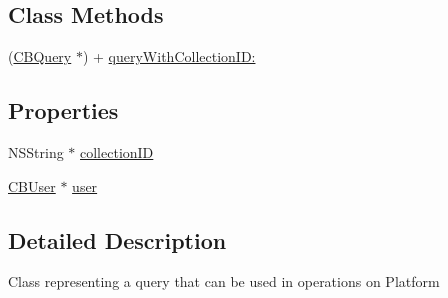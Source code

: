 \subsection*{Class Methods}
\begin{DoxyCompactItemize}
\item 
(\hyperlink{interface_c_b_query}{C\+B\+Query} $\ast$) + \hyperlink{interface_c_b_query_a616541706465f78433a3b2488760df4f}{query\+With\+Collection\+I\+D\+:}
\end{DoxyCompactItemize}
\subsection*{Properties}
\begin{DoxyCompactItemize}
\item 
N\+S\+String $\ast$ \hyperlink{interface_c_b_query_ad7e594dc30699c9dbae407e55b588b00}{collection\+I\+D}
\item 
\hyperlink{interface_c_b_user}{C\+B\+User} $\ast$ \hyperlink{interface_c_b_query_af5679b48acc1313cab6dd83e2777b440}{user}
\end{DoxyCompactItemize}


\subsection{Detailed Description}
Class representing a query that can be used in operations on Platform 

